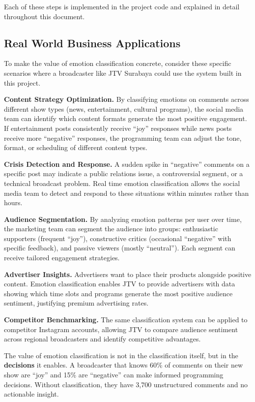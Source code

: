 \documentclass[12pt,a4paper,twoside]{article}
\theoremstyle{definition}
\begin{document}
Each of these steps is implemented in the project code and explained in detail throughout this document.


\subsection{Real World Business Applications}
 
To make the value of emotion classification concrete, consider these specific scenarios where a broadcaster like JTV Surabaya could use the system built in this project.
 
\textbf{Content Strategy Optimization.} By classifying emotions on comments across different show types (news, entertainment, cultural programs), the social media team can identify which content formats generate the most positive engagement. If entertainment posts consistently receive ``joy'' responses while news posts receive more ``negative'' responses, the programming team can adjust the tone, format, or scheduling of different content types.
 
\textbf{Crisis Detection and Response.} A sudden spike in ``negative'' comments on a specific post may indicate a public relations issue, a controversial segment, or a technical broadcast problem. Real time emotion classification allows the social media team to detect and respond to these situations within minutes rather than hours.
 
\textbf{Audience Segmentation.} By analyzing emotion patterns per user over time, the marketing team can segment the audience into groups: enthusiastic supporters (frequent ``joy''), constructive critics (occasional ``negative'' with specific feedback), and passive viewers (mostly ``neutral''). Each segment can receive tailored engagement strategies.
 
\textbf{Advertiser Insights.} Advertisers want to place their products alongside positive content. Emotion classification enables JTV to provide advertisers with data showing which time slots and programs generate the most positive audience sentiment, justifying premium advertising rates.
 
\textbf{Competitor Benchmarking.} The same classification system can be applied to competitor Instagram accounts, allowing JTV to compare audience sentiment across regional broadcasters and identify competitive advantages.
 
\begin{notebox}
The value of emotion classification is not in the classification itself, but in the \textbf{decisions} it enables. A broadcaster that knows 60\% of comments on their new show are ``joy'' and 15\% are ``negative'' can make informed programming decisions. Without classification, they have 3{,}700 unstructured comments and no actionable insight.
\end{notebox}
\end{document}
